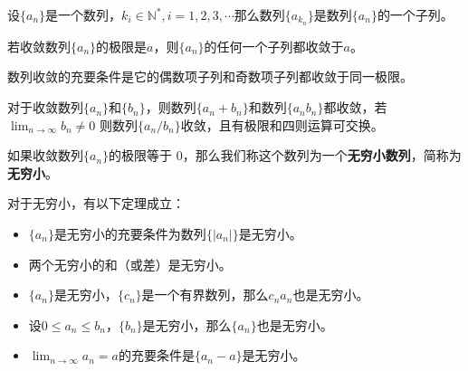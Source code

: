 

\begin{definition}[子列]
设\(\{a_n\}\)是一个数列，\(k_i\in \mathbb N^*, i = 1, 2, 3,\cdots\)那么数列\(\{a_{k_n}\}\)是数列\(\{a_n\}\)的一个子列。
\end{definition}

\begin{theorem}
若收敛数列\(\{a_n\}\)的极限是\(a\)，则\(\{a_n\}\)的任何一个子列都收敛于\(a\)。
\end{theorem}


\begin{inference}
	数列收敛的充要条件是它的偶数项子列和奇数项子列都收敛于同一极限。
\end{inference}

\begin{theorem}[极限的四则运算]
	对于收敛数列\(\{a_n\}\)和\(\{b_n\}\)，则数列\(\{a_n+b_n\}\)和数列\(\{a_nb_n\}\)都收敛，若\(\lim_{n\rightarrow \infty} b_n\ne 0\) 则数列\(\{a_n/b_n\}\)收敛，且有极限和四则运算可交换。
\end{theorem}


\begin{definition}[无穷小]
	如果收敛数列\(\{a_n\}\)的极限等于
	0，那么我们称这个数列为一个\textbf{无穷小数列}，简称为\textbf{无穷小}。
\end{definition}


\begin{theorem}
	对于无穷小，有以下定理成立：
	
	\begin{itemize}
		\def\labelenumi{\arabic{enumi}.}
		\item
		\(\{a_n\}\)是无穷小的充要条件为数列\(\{|a_n|\}\)是无穷小。
		\item
		两个无穷小的和（或差）是无穷小。
		\item
		\(\{a_ n\}\)是无穷小，\(\{c _ n\}\)是一个有界数列，那么\(c_n a _ n\)也是无穷小。
		\item
		设\(0\le a_ n\le b _ n\)，\(\{b_n\}\)是无穷小，那么\(\{a_n\}\)也是无穷小。
		\item
		\(\lim_{n\rightarrow \infty}a_n = a\)的充要条件是\(\{a_n-a\}\)是无穷小。
	\end{itemize}
\end{theorem}

